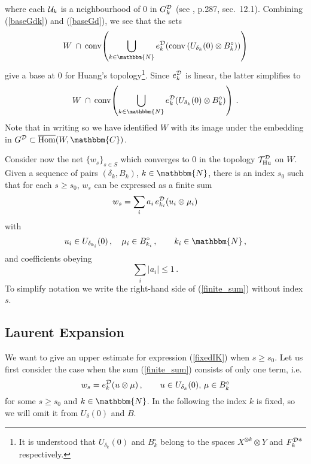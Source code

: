\documentclass[a4paper,12pt,twoside]{article}
\renewcommand{\c}[1]{{\cal #1}}
\newcommand{\bN}{\mathbbm{N}}
\newcommand{\bC}{\mathbbm{C}}
\newcommand{\conv}{{\rm conv\,}}
\newcommand{\cT}{{\cal T}}
\newcommand{\eq}[1]{(\ref{#1})}
\newcommand{\D}{\c{D}}
\newcommand{\Hu}{{\rm Hu}}
\newcommand{\THud}{\cT_{\Hu}^{\D}}
\newcommand{\Fdd}{F^{\D{\textstyle *}}_k}
\newcommand{\ed}{e_k^{\D}}
\newcommand{\edi}{e_{k_i}^{\D}}
\newcommand{\Gdk}{G^{\D}_k}
\newcommand{\Gd}{G^{\D}}
\newcommand{\Bp}{B^{\circ}}
\begin{document}
where each ${\cal U}_k$ is a neighbourhood of 0 in $\Gdk$
(see \cite{Narici}, p.287, sec.\ 12.1).
Combining \eq{baseGdk} and \eq{baseGd}, we see that the sets
$$W\:\cap\:\conv\!\!\left(\bigcup_{k\in\bN}\ed(\conv(U_{\delta_k}(0)\otimes\Bp_k))\right)$$
give a base at 0 for Huang's topology\footnote
{It is understood that
$U_{\delta_k}(0)$ and $\Bp_k$ belong to the spaces $X^{\otimes k}\otimes Y$
and $\Fdd$ respectively.}. Since $\ed$ is linear, the latter simplifies
to
\begin{equation}
\label{baseW}
W\:\cap\: \conv\!\!\left(\bigcup_{k\in\bN}\ed(U_{\delta_k}(0)\otimes\Bp_k)\right)\,.
\end{equation}
Note that in writing so we have
identified $W$ with its image under the embedding in $\Gd\subset\overline{\rm Hom}(W,\bC)$.

Consider now the net $\{w_s\}_{s\in S}$ which converges to 0 in the topology
$\THud$ on $W$. Given a sequence of pairs $(\delta_k,B_k)$, $k\in\bN$,
there is an index $s_0$ such that for each $s\ge s_0$, $w_s$ can
be expressed as a finite sum
\begin{equation}
\label{finite_sum}
w_s = \sum_i a_i\,\edi(u_i\otimes\mu_i)
\end{equation}
with
$$u_i\in U_{\delta_{k_i}}(0)\,,\quad\mu_i\in\Bp_{k_i}\,,\qquad k_i\in\bN\,,$$
and coefficients obeying
$$\sum_i |a_i| \le 1\,.$$
To simplify notation we write the right-hand side of \eq{finite_sum} without
index $s$.
\subsection*{Laurent Expansion}
We want to give an upper estimate for expression \eq{fixedIK} when $s\ge s_0$.
Let us first consider
the case when
the sum \eq{finite_sum} consists of only one term, i.e.
$$w_s = \ed(u\otimes\mu)\,,\qquad\mbox{$u\in U_{\delta_k}(0)$, $\mu\in\Bp_k$}$$
for some $s\ge s_0$ and $k\in\bN$.
In the following the index $k$ is fixed, so we will omit it from
$U_{\delta}(0)$ and $B$.
\end{document}
